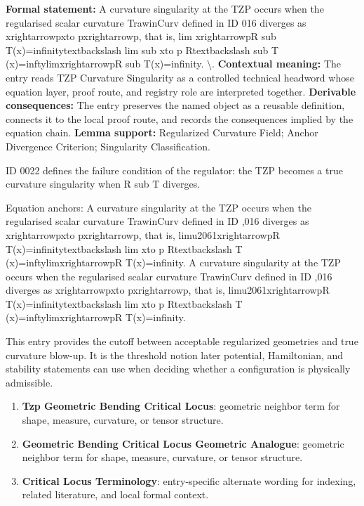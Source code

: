 \begingroup\footnotesize\setlength{\emergencystretch}{3em}\sloppy
\textbf{Formal statement:} A curvature singularity at the TZP occurs when the regularised scalar curvature TrawinCurv defined in ID 016 diverges as xrightarrowpxto pxrightarrowp, that is, lim xrightarrowpR sub T(x)=infinitytextbackslash lim sub xto p Rtextbackslash sub T (x)=inftylimxrightarrowpR sub T(x)=infinity. \textbackslash{}. \textbf{Contextual meaning:} The entry reads TZP Curvature Singularity as a controlled technical headword whose equation layer, proof route, and registry role are interpreted together. \textbf{Derivable consequences:} The entry preserves the named object as a reusable definition, connects it to the local proof route, and records the consequences implied by the equation chain. \textbf{Lemma support:} Regularized Curvature Field; Anchor Divergence Criterion; Singularity Classification.\par
\endgroup

ID 0022 defines the failure condition of the regulator: the TZP becomes a true curvature singularity when R sub T diverges.

Equation anchors: A curvature singularity at the TZP occurs when the regularised scalar curvature TrawinCurv defined in ID ,016 diverges as xrightarrowpxto pxrightarrowp, that is, limu2061xrightarrowpR T(x)=infinitytextbackslash lim xto p Rtextbackslash T (x)=inftylimxrightarrowpR T(x)=infinity. A curvature singularity at the TZP occurs when the regularised scalar curvature TrawinCurv defined in ID ,016 diverges as xrightarrowpxto pxrightarrowp, that is, limu2061xrightarrowpR T(x)=infinitytextbackslash lim xto p Rtextbackslash T (x)=inftylimxrightarrowpR T(x)=infinity.

This entry provides the cutoff between acceptable regularized geometries and true curvature blow-up. It is the threshold notion later potential, Hamiltonian, and stability statements can use when deciding whether a configuration is physically admissible.
\endgroup

\begingroup\footnotesize\sloppy
\begin{enumerate}[leftmargin=1.35em,itemsep=1pt,topsep=1pt,parsep=0pt]
\item \textbf{Tzp Geometric Bending Critical Locus}: geometric neighbor term for shape, measure, curvature, or tensor structure.
\item \textbf{Geometric Bending Critical Locus Geometric Analogue}: geometric neighbor term for shape, measure, curvature, or tensor structure.
\item \textbf{Critical Locus Terminology}: entry-specific alternate wording for indexing, related literature, and local formal context.
\end{enumerate}
\endgroup

